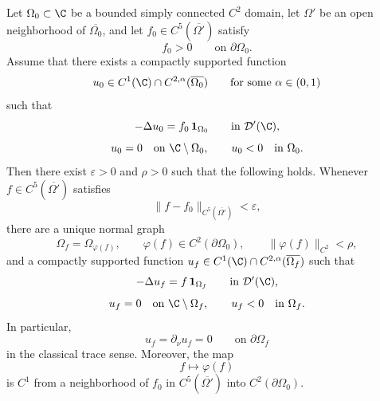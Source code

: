 \begin{proposition}\label{prop:isakov-tailored}
Let \(\Omega_0\subset\C\) be a bounded simply connected \(C^2\) domain, let
\(\Omega'\) be an open neighborhood of \(\overline{\Omega_0}\), and let
\(f_0\in C^5(\overline{\Omega'})\) satisfy
\[
f_0>0 \qquad\text{on }\partial\Omega_0 .
\]
Assume that there exists a compactly supported function
\[
u_0\in C^1(\C)\cap C^{2,\alpha}(\overline{\Omega_0})
\qquad\text{for some }\alpha\in(0,1)
\]
such that
\begin{equation}\label{eq:appendix-reference-problem}
-\Delta u_0=f_0\,\mathbf 1_{\Omega_0}
\qquad\text{in }\mathcal D'(\C),
\end{equation}
\[
u_0=0 \quad\text{on }\C\setminus\Omega_0,
\qquad
u_0<0 \quad\text{in }\Omega_0 .
\]
Then there exist \(\varepsilon>0\) and \(\rho>0\) such that the following
holds. Whenever \(f\in C^5(\overline{\Omega'})\) satisfies
\[
\|f-f_0\|_{C^5(\overline{\Omega'})}<\varepsilon,
\]
there are a unique normal graph
\[
\Omega_f=\Omega_{\varphi(f)},\qquad
\varphi(f)\in C^2(\partial\Omega_0),\qquad
\|\varphi(f)\|_{C^2}<\rho,
\]
and a compactly supported function \(u_f\in C^1(\C)\cap
C^{2,\alpha}(\overline{\Omega_f})\) such that
\begin{equation}\label{eq:appendix-perturbed-problem}
-\Delta u_f=f\,\mathbf 1_{\Omega_f}
\qquad\text{in }\mathcal D'(\C),
\end{equation}
\[
u_f=0 \quad\text{on }\C\setminus\Omega_f,
\qquad
u_f<0 \quad\text{in }\Omega_f .
\]
In particular,
\[
u_f=\partial_\nu u_f=0
\qquad\text{on }\partial\Omega_f
\]
in the classical trace sense. Moreover, the map
\[
f\mapsto\varphi(f)
\]
is \(C^1\) from a neighborhood of \(f_0\) in \(C^5(\overline{\Omega'})\) into
\(C^2(\partial\Omega_0)\).
\end{proposition}

